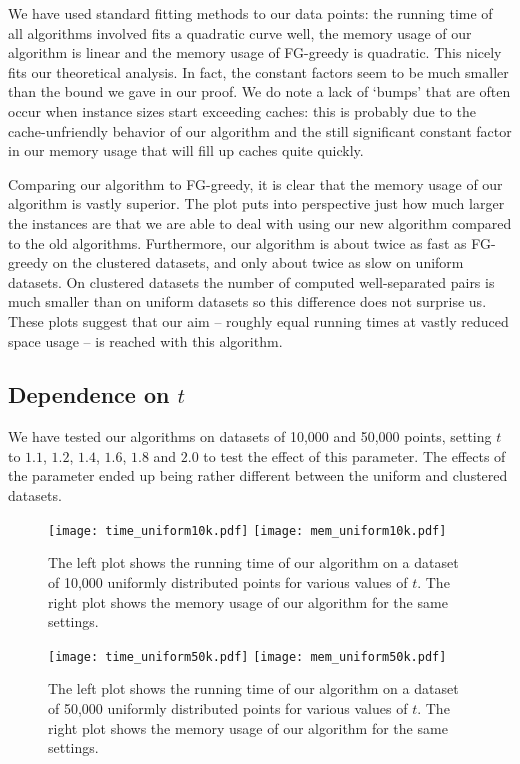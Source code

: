 \documentclass[runningheads,envcountsame,oribibl,orivec]{llncs}
\begin{document}
We have used standard fitting methods to our data points: the running time of all algorithms involved fits a quadratic curve well, the memory usage of our algorithm is linear and the memory usage of FG-greedy is quadratic. This nicely fits our theoretical analysis. In fact, the constant factors seem to be much smaller than the bound we gave in our proof. We do note a lack of `bumps' that are often occur when instance sizes start exceeding caches: this is probably due to the cache-unfriendly behavior of our algorithm and the still significant constant factor in our memory usage that will fill up caches quite quickly.

Comparing our algorithm to FG-greedy, it is clear that the memory usage of our algorithm is vastly superior. The plot puts into perspective just how much larger the instances are that we are able to deal with using our new algorithm compared to the old algorithms. Furthermore, our algorithm is about twice as fast as FG-greedy on the clustered datasets, and only about twice as slow on uniform datasets. On clustered datasets the number of computed well-separated pairs is much smaller than on uniform datasets so this difference does not surprise us. These plots suggest that our aim -- roughly equal running times at vastly reduced space usage -- is reached with this algorithm.

\subsection{Dependence on $t$}

We have tested our algorithms on datasets of 10,000 and 50,000 points, setting $t$ to $1.1$, $1.2$, $1.4$, $1.6$, $1.8$ and $2.0$ to test the effect of this parameter. The effects of the parameter ended up being rather different between the uniform and clustered datasets.

\begin{figure}[h!]\centering
\texttt{[image: time\_uniform10k.pdf]}
\texttt{[image: mem\_uniform10k.pdf]}
\caption{The left plot shows the running time of our algorithm on a dataset of 10,000 uniformly distributed points for various values of $t$. The right plot shows the memory usage of our algorithm for the same settings.}
\label{figure:uniplot1}
\end{figure}

\begin{figure}[h!]\centering
\texttt{[image: time\_uniform50k.pdf]}
\texttt{[image: mem\_uniform50k.pdf]}
\caption{The left plot shows the running time of our algorithm on a dataset of 50,000 uniformly distributed points for various values of $t$. The right plot shows the memory usage of our algorithm for the same settings.}
\label{figure:uniplot2}
\end{figure}
\end{document}
